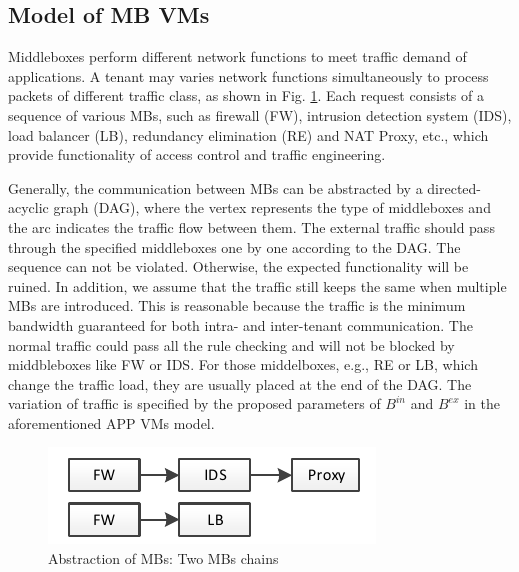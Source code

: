 \documentclass[10pt, conference, letterpaper]{IEEEtran}
\begin{document}



\subsection{Model of MB VMs}\label{sec:modelformb}

Middleboxes perform different network functions to meet traffic demand of applications. A tenant may varies network functions simultaneously to process packets of different traffic class, as shown in Fig. \ref{fig:chain}. Each request consists of a sequence of various MBs, such as firewall (FW), intrusion detection system (IDS), load balancer (LB), redundancy elimination (RE) and NAT Proxy, etc., which provide functionality of access control and traffic engineering. 


Generally, the communication between MBs can be abstracted by a directed-acyclic graph (DAG), where the vertex represents the type of middleboxes and the arc indicates the traffic flow between them. The external traffic should pass through the specified middleboxes one by one according to the DAG. The sequence can not be violated. Otherwise, the expected functionality will be ruined. In addition, we assume that the traffic still keeps the same when multiple MBs are introduced. This is reasonable because the traffic is the minimum bandwidth guaranteed for both intra- and inter-tenant communication. The normal traffic could pass all the rule checking and will not be blocked by middbleboxes like FW or IDS. For those middelboxes, e.g., RE or LB, which change the traffic load, they are usually placed at the end of the DAG. The variation of traffic is specified by the proposed parameters of $B^{in}$ and $B^{ex}$ in the aforementioned APP VMs model.

\begin{figure}
	\centering
		\includegraphics[width=3.0 in]{fig/chain.pdf}
	\caption{Abstraction of MBs: Two MBs chains}
	\label{fig:chain}
\end{figure}
\end{document}

